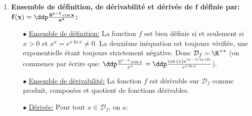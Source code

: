 \begin{correction}
\begin{enumerate}
\begin{itemize}
\begin{itemize}
\item[$\star$] Si $x\leq -1$ alors $-x\geq 1$ et on peut donc passer au carr\'ee tout en conservant l'\'equivalence, la fonction carr\'ee \'etant strictement croissante sur $\R^+$. On obtient alors: $\sqrt{x^2-1}>-x\Leftrightarrow x^2-1>x^2\Leftrightarrow -1>0$. Toujours faux. 
\end{itemize}
Donc $\mathcal{D}_f=\lbrack 1,+\infty\lbrack$.
\item[$\bullet$] \underline{Ensemble de d\'erivabilit\'e:} La fonction $f$ est d\'erivable sur $\rbrack 1,+\infty\lbrack$ car on doit avoir en plus $x^2-1>0$ comme somme et compos\'ee de fonctions d\'erivables.
\item[$\bullet$] \underline{D\'eriv\'ee:} Pour tout $x\in\mathcal{D}_f$, on a: 
 \end{itemize}
\item  \textbf{Ensemble de d\'efinition, de d\'erivabilit\'e et d\'eriv\'ee de $\mathbf{f}$ d\'efinie par: $\mathbf{f(x)=\ddp\frac{3^{x-1}\cos{x}}{x^x}}$:}
\begin{itemize}
\item[$\bullet$] \underline{Ensemble de d\'efinition:} La fonction $f$ est bien d\'efinie si et seulement si $x>0$ et $x^x=e^{x\ln{x}}\not= 0$. La deuxi\`{e}me in\'equation est toujours v\'erifi\'ee, une exponentielle \'etant toujours strictement n\'egative. Donc $\mathcal{D}_f=\R^{+\star}$ (on commence par \'ecrire que: $\ddp\frac{3^{x-1}\cos{x}}{x^x}=\ddp\frac{\cos{(x)}e^{(x-1)\ln{(3)}}   }{e^{x\ln{x}}}$).
\item[$\bullet$] \underline{Ensemble de d\'erivabilit\'e:} La fonction $f$ est d\'erivable sur $\mathcal{D}_f$ comme produit, compos\'ees et quotient de fonctions d\'erivables.
\item[$\bullet$] \underline{D\'eriv\'ee:} Pour tout $x\in\mathcal{D}_f$, on a: 
 \end{itemize}
\end{enumerate}
\end{correction}



